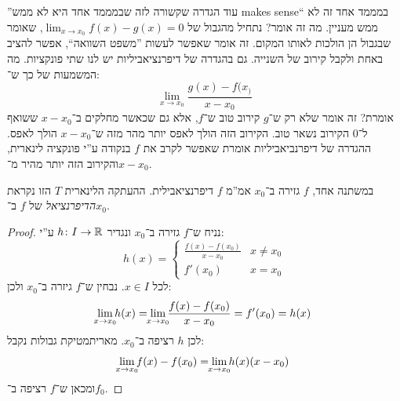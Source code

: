 \documentclass[name=רשימות חשבון דיפרנציאלי ואינטגרלי 1א]{../../../tex/classes/megasumPreamble}
\begin{document}
	''עוד הגדרה שקשורה לזה שבמממד אחד היא לא ממש makes sense``
	במממד אחד זה לא ממש מעניין. מה זה אומר? נתחיל מהגבול של $\lim_{x \to x_0} f(x) - g(x) = 0$, שאומר שבגבול הן הולכות לאותו המקום. זה אומר שאפשר לעשות ''משפט השוואה``, אפשר להציב באחת ולקבל קירוב של השנייה. גם בהגדרה של דיפרנציאביליות יש לנו שתי פונקציות. מה המשמעות של כך ש־:
	\[ \lim_{ x\to x_0} \frac{g(x) - f(x_)}{x - x_0} \]
	אומרת? זה אומר שלא רק ש־$g$ קירוב טוב ש־$f$, אלא גם שכאשר מחלקים ב־$x - x_0$ ששואף ל־$0$ הקירוב נשאר טוב. הקירוב הזה הולך לאפס יותר מהר מזה ש־$x - x_0$ הולך לאפס. ההגדרה של דיפרנביאביליות אומרת שאפשר לקרב את $f$ בנקודה ע''י פונקציה לינארית, והקירוב הזה יותר מהיר מ־$x - x_0$.

	במשתנה אחד, $f$ גזירה ב־$x_0$ אמ''מ $f$ דיפרנציאבילית. ההעתקה הלינארית $T$ הזו נקראת \textit{הדיפרנציאל} של $f$ ב־$x_0$.

	\begin{proof}
		נניח ש־$f$ גזירה ב־$x_0$ ונגדיר $h \colon I \to \mathbb{R}$ ע''י:
		\[ h(x) = \begin{cases}
			\frac{f(x) - f(x_0)}{x - x_0} & x \neq x_0 \\
			f'(x_0) & x = x_0
		\end{cases} \]
		לכל $x \in I$. נבחין ש־$f$ גיזרה ב־$x_0$ ולכן:
		\[ \lim_{\mathclap{x \to x_0}} h(x) = \lim_{\mathclap{x \to x_0}} \frac{f(x) - f(x_0)}{x - x_0} = f'(x_0) = h(x) \]
		לכן $h$ רציפה ב־$x_0$. מאריתמטיקת גבולות נקבל:
		\[ \lim_{\mathclap{x \to x_0}} f(x) - f(x_0) = \lim_{\mathclap{x \to x_0}} h(x) (x - x_0) \]
		ומכאן ש־$f$ רציפה ב־$f_0$.
	\end{proof}
\end{document}
